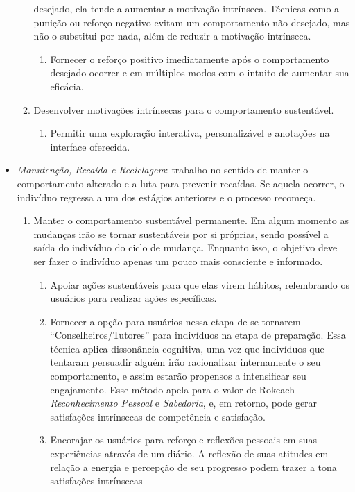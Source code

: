 \begin{itemize}
\begin{enumerate}
desejado, ela tende a aumentar a motivação intrínseca. Técnicas como a punição ou 
reforço negativo evitam um comportamento não desejado, mas não o substitui por
nada, além de reduzir a motivação intrínseca.
\begin{enumerate}
\item Fornecer o reforço positivo imediatamente após o comportamento desejado
ocorrer e em múltiplos modos com o intuito de aumentar sua eficácia.
\end{enumerate}
\item Desenvolver motivações intrínsecas para o comportamento sustentável.
\begin{enumerate}
\item Permitir uma exploração interativa, personalizável e anotações na
interface oferecida.
\end{enumerate}
\end{enumerate}
\item \emph{Manutenção, Recaída e Reciclagem}: trabalho no sentido de manter o
comportamento alterado e a luta para prevenir recaídas. Se aquela ocorrer, o
indivíduo regressa a um dos estágios anteriores e o processo recomeça.
\begin{enumerate}
\item Manter o comportamento sustentável permanente. Em algum momento as
mudanças irão se tornar sustentáveis por si próprias, sendo possível a saída 
do indivíduo do ciclo de mudança. Enquanto isso, o objetivo deve ser fazer o
indivíduo apenas um pouco mais consciente e informado.
\begin{enumerate}
\item Apoiar ações sustentáveis para que elas virem hábitos, relembrando os
usuários para realizar ações específicas.
\item Fornecer a opção para usuários nessa etapa de se tornarem
``Conselheiros/Tutores'' para indivíduos na etapa de preparação. Essa técnica
aplica dissonância cognitiva, uma vez que indivíduos que tentaram persuadir
alguém irão racionalizar internamente o seu comportamento, e assim estarão
propensos a intensificar seu engajamento. Esse método apela para o valor de
Rokeach \emph{Reconhecimento Pessoal} e \emph{Sabedoria}, e, em retorno, pode
gerar satisfações intrínsecas de competência e satisfação.
\item Encorajar os usuários para reforço e reflexões pessoais em suas
experiências através de um diário. A reflexão de suas atitudes em relação a
energia e percepção de seu progresso podem trazer a tona satisfações intrínsecas

\end{enumerate}
\end{enumerate}
\end{itemize}
